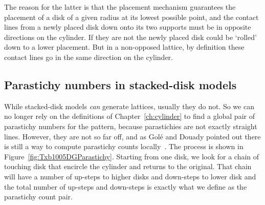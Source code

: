 

The reason for the latter is that the placement mechanism guarantees the placement of a disk of a given radius at its lowest possible point, and the contact lines from a newly placed disk down onto its two supports must be in opposite directions on the cylinder. If they are not the newly placed disk could be `rolled' down to a lower placement. But in a non-opposed lattice, by definition these contact lines go in the same direction on the cylinder.


\subsection{Parastichy numbers in stacked-disk models}
While stacked-disk models \textit{can} generate lattices, usually they do not. 
So we can no longer rely on the  definitions of Chapter~\ref{ch:cylinder}
to find a global pair of parastichy numbers for the pattern, because  parastichies are not exactly straight lines.  However, they are not so far off, and as Gol\'e and Douady pointed out there is still a way to compute parastichy counts locally~\autocite{goleFibonacciQuasisymmetricPhyllotaxis2016}.
The process is shown in Figure~\ref{fig:Txb1005DGParastichy}. Starting from one disk, we look for a chain of touching disk that encircle the cylinder and returns to the original. That chain will have a number of up-steps to higher disks and down-steps to lower disk and the total number of up-steps and down-steps is exactly what we define as the parastichy count pair. 
